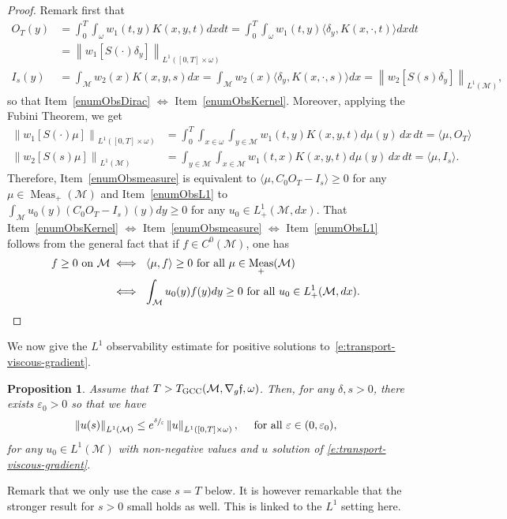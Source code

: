 \documentclass[10pt]{amsart}
\newcommand{\GCC}{\textup{GCC}}
\newtheorem{proposition}[lemma]{Proposition}
\theoremstyle{definition}
\newcommand{\M}{\ensuremath{\mathcal M}}
\newcommand{\f}{\ensuremath{\mathfrak{f}}}
\DeclareMathOperator{\Meas}{Meas}
\newcommand\bnp{\begin{proof}}
\newcommand\enp{\end{proof}}
\newcommand\nor[2]{\left\|#1\right\|_{#2}}
\let\e\varepsilon
\let\eps\varepsilon
\begin{document}
\bnp
Remark first that
\begin{align*}
O_T(y)& =\int_0^T \int_{\omega} w_1(t,y)K(x,y,t)dx dt = \int_0^T \int_{\omega} w_1(t,y)\langle \delta_y, K(x,\cdot,t ) \rangle dx dt \\
& = \nor{w_1 \left[S(\cdot) \delta_y \right]}{L^1([0,T]\times \omega)}\\
I_s (y)& =\int_{\M} w_2(x)K(x,y, s)dx = \int_{\M}w_2(x)\langle \delta_y, K(x,\cdot,s)\rangle dx = \nor{w_2 \left[S(s) \delta_y \right]}{L^1(\M)},
\end{align*}
so that Item~\eqref{enumObsDirac} $\Leftrightarrow$ Item~\eqref{enumObsKernel}. Moreover, applying the Fubini Theorem, we get
\begin{align*}
\nor{w_1 [S(\cdot)\mu]}{L^1([0,T]\times \omega)} &=\int_0^T \int_{x\in \omega}\int_{y\in \M} w_1(t,y)K(x,y,t)d\mu(y)\,dx\,dt=\langle \mu, O_T \rangle\\
\nor{w_2 \left[S(s)\mu\right]}{L^1(\M)}&=\int_{y\in \M}\int_{x\in \M} w_1(t,x)K(x,y,t)d\mu(y)\,dx\,dt=\langle \mu, I_s \rangle.
\end{align*}
Therefore, Item~\eqref{enumObsmeasure} is equivalent to $\langle \mu, C_0O_T-I_s \rangle \geq 0$ for any $\mu \in \Meas_+(\M)$ and Item~\eqref{enumObsL1} to $\int_\M u_0(y) (C_0O_T-I_s )(y) dy \geq 0$ for any $u_0 \in L^1_+(\M,dx)$. That Item~\eqref{enumObsKernel} $\Leftrightarrow$ Item~\eqref{enumObsmeasure} $\Leftrightarrow$ Item~\eqref{enumObsL1} follows from the general fact that if $f \in C^0(\M)$, one has
\begin{align*}
f \geq 0 \text{ on }\M & \iff \ \langle \mu, f \rangle \geq 0 \text{ for all }\mu \in \Meas_+(\M) \\
& \iff \ \int_\M u_0(y) f(y) dy \geq 0\text{ for all }u_0 \in L^1_+(\M,dx).\qedhere
\end{align*}
\enp
We now give the $L^1$ observability estimate for positive solutions to~\eqref{e:transport-viscous-gradient}.
\begin{proposition}
\label{propobsL1}
Assume that $T>T_{\GCC}(\M, \nabla_g\f,\omega)$. Then, for any $\delta, s >0$, there exists $\e_0>0$ so that we have
\begin{equation}
\label{estimL1+}
\nor{u(s)}{L^1(\M)}\leq e^{\sfrac{\delta}{\e}}\nor{u}{L^1([0,T]\times \omega)}, \quad \text{ for all } \eps \in (0,\eps_0),
\end{equation}
for any $u_0\in L^1(\M)$ with non-negative values and $u$ solution of \eqref{e:transport-viscous-gradient}.
\end{proposition}
Remark that we only use the case $s=T$ below. It is however remarkable that the stronger result for $s >0$ small holds as well. This is linked to the $L^1$ setting here.
\end{document}
